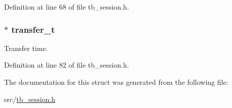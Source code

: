 Definition at line 68 of file tb\-\_\-session.\-h.

\hypertarget{structtb__session__t_a0cb6fc264a37771e927fe0b383fc600c}{
\subsubsection[{transfer\-\_\-t}]{$\ast$ transfer\-\_\-t}}\label{structtb__session__t_a0cb6fc264a37771e927fe0b383fc600c}


Transfer time. 



Definition at line 82 of file tb\-\_\-session.\-h.



The documentation for this struct was generated from the following file\-:\begin{DoxyCompactItemize}
\item 
src/\hyperlink{tb__session_8h}{tb\-\_\-session.\-h}\end{DoxyCompactItemize}
